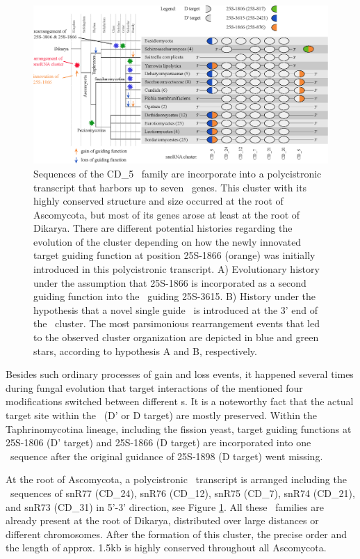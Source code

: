 \begin{figure}
  \centering
  \includegraphics[width=\textwidth]{pics/target_switches_CD_5_cluster.eps}
  \caption[Evolution of a \sno\ cluster harboring CD\_5
  sequences.]{Sequences of the CD\_5 \sno\ family are incorporate into
  a polycistronic transcript that harbors up to seven \sno\
  genes. This cluster with its highly conserved structure and size occurred at the root of Ascomycota, but most of
  its genes arose at least at the root of Dikarya. There are different
  potential histories regarding the evolution of the cluster depending on how
  the newly innovated target guiding function at position 25S-1866
  (orange) was initially introduced in this polycistronic
  transcript. A) Evolutionary history under the assumption that
  25S-1866 is incorporated as a second guiding function into the \sno\
  guiding 25S-3615. B) History under the hypothesis that a novel
  single guide \sno\ is introduced at the 3' end of the \sno\
  cluster. The most parsimonious rearrangement events that led to the
  observed cluster organization are depicted in
  blue and green stars, according to hypothesis A and B, respectively.}
\label{fig:CD_5_cluster_history}
\end{figure}

Besides such ordinary processes of gain and loss events, it happened
several times during fungal evolution that target interactions
of the mentioned four modifications switched between different \sno s.
It is a noteworthy fact that the actual target site within the \sno\
(D' or D target) are mostly preserved. Within the Taphrinomycotina
lineage, including the fission yeast, target guiding functions at
25S-1806 (D' target) and 25S-1866 (D target) are incorporated into one \sno\ sequence after
the original guidance of 25S-1898 (D target) went missing. 

At the root of Ascomycota, a polycistronic \sno\ transcript is
arranged including the \sno\ sequences of snR77 (CD\_24), snR76 (CD\_12),
snR75 (CD\_7), snR74 (CD\_21), and snR73 (CD\_31) in 5'-3' direction, see Figure
\ref{fig:CD_5_cluster_history}.  All these \sno\ families
are already present at the root of Dikarya, distributed over large
distances or different chromosomes. After the formation of this
cluster, the precise order and the
length of approx. 1.5kb is highly conserved throughout all
Ascomycota. 

